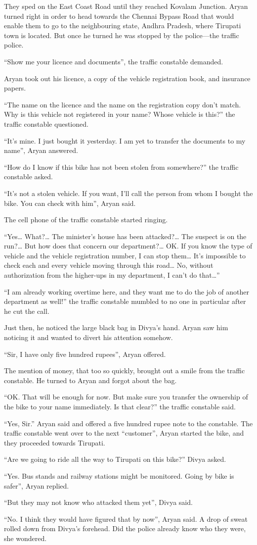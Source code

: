 They sped on the East Coast Road until they reached Kovalam Junction. Aryan
turned right in order to head towards the Chennai Bypass Road that would enable
them to go to the neighbouring state, Andhra Pradesh, where Tirupati town is
located. But once he turned he was stopped by the police—the traffic police.

“Show me your licence and documents”, the traffic constable demanded.

Aryan took out his licence, a copy of the vehicle registration book, and insurance
papers.

“The name on the licence and the name on the registration copy don't match. Why
is this vehicle not registered in your name? Whose vehicle is this?” the traffic
constable questioned.

“It's mine. I just bought it yesterday. I am yet to transfer the documents to my
name”, Aryan answered.

“How do I know if this bike has not been stolen from somewhere?” the traffic
constable asked.

“It's not a stolen vehicle. If you want, I'll call the person from whom I bought
the bike. You can check with him”, Aryan said.

The cell phone of the traffic constable started ringing.

“Yes… What?… The minister's house has been attacked?… The suspect is on
the run?… But how does that concern our department?… OK. If you know the
type of vehicle and the vehicle registration number, I can stop them… It's
impossible to check each and every vehicle moving through this road… No,
without authorization from the higher-ups in my department, I can't do that…”

“I am already working overtime here, and they want me to do the job of another
department as well!” the traffic constable mumbled to no one in particular
after he cut the call.

Just then, he noticed the large black bag in Divya's hand. Aryan saw him noticing
it and wanted to divert his attention somehow.

“Sir, I have only five hundred rupees”, Aryan offered.

The mention of money, that too so quickly, brought out a smile from the traffic
constable. He turned to Aryan and forgot about the bag.

“OK. That will be enough for now. But make sure you transfer the ownership of
the bike to your name immediately. Is that clear?” the traffic constable said.

“Yes, Sir.” Aryan said and offered a five hundred rupee note to the constable.
The traffic constable went over to the next ``customer'', Aryan started the bike,
and they proceeded towards Tirupati.

“Are we going to ride all the way to Tirupati on this bike?” Divya asked.

“Yes. Bus stands and railway stations might be monitored. Going by bike is safer”,
Aryan replied.

“But they may not know who attacked them yet”, Divya said.

“No. I think they would have figured that by now”, Aryan said. A drop of sweat
rolled down from Divya's forehead. Did the police already know who they were,
she wondered.
